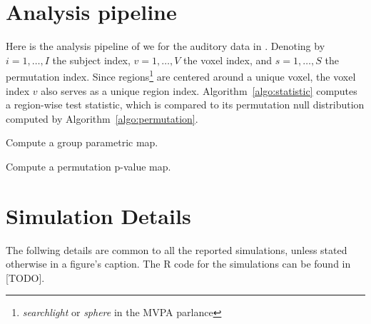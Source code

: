 \documentclass[12pt,a4paper]{article}
\begin{document}



\appendix


\newpage

\section{Analysis pipeline}
\label{apx:analysis}

Here is the analysis pipeline of \cite{stelzer_statistical_2013} we for the auditory data in \cite{gilron_quantifying_2016}.
Denoting by 
$i=1,\dots,I$ the subject index, 
$v=1,\dots,V$ the voxel index, and 
$s = 1,\dots,S$ the permutation index. 
Since regions\footnote{\emph{searchlight} or \emph{sphere} in the MVPA parlance} are centered around a unique voxel, the voxel index $v$ also serves as a unique region index.
Algorithm~\ref{algo:statistic} computes a region-wise test statistic, which is compared to its permutation null distribution computed by Algorithm~\ref{algo:permutation}.


\begin{algorithm}[H]
\caption{Compute a group parametric map.}
\label{algo:statistic}

\end{algorithm}


\begin{algorithm}[H]
\caption{Compute a permutation p-value map.} 
\label{algo:permutation}

\end{algorithm}

\newpage


\section{Simulation Details}
\label{apx:simulation_details}

The follwing details are common to all the reported simulations, unless stated otherwise in a figure's caption. 
The \textsf{R} code for the simulations can be found in [TODO].
\end{document}
